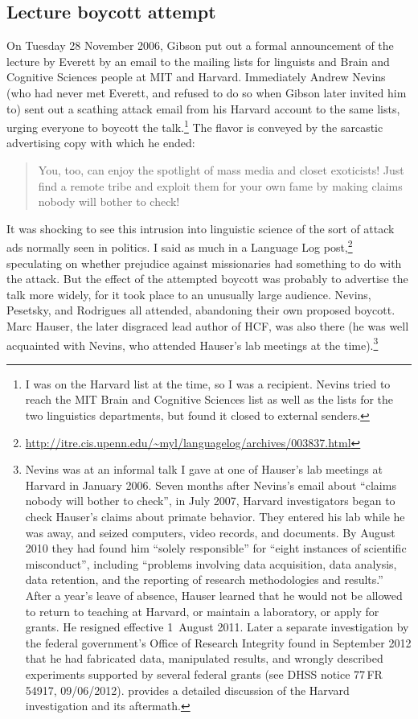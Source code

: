 \documentclass[output=paper,colorlinks,citecolor=brown
]{langscibook}
\begin{document}
\subsection{Lecture boycott attempt}

On Tuesday 28 November 2006, Gibson put out a formal announcement of
the lecture by Everett by an email to the mailing lists for linguists
and Brain and Cognitive Sciences people at MIT and Harvard. Immediately Andrew Nevins (who had
never met Everett, and refused to do so when Gibson later invited him to)
sent out a scathing attack email from his Harvard account to the same
lists, urging everyone to boycott the talk.\footnote{%
   I was on the Harvard list at the time, so I was a recipient. Nevins
   tried to reach the MIT Brain and Cognitive Sciences list as well as
   the lists for the two linguistics departments, but found it closed to
   external senders.}
The flavor is conveyed by the sarcastic advertising copy with which
he ended:
\begin{quote}
You, too, can enjoy the spotlight of mass media and closet
exoticists! Just find a remote tribe and exploit them for your
own fame by making claims nobody will bother to check!
\end{quote}

It was shocking to see this intrusion into linguistic science of the
sort of attack ads normally seen in politics. I said as much in a
Language Log post,\footnote{%
   \url{http://itre.cis.upenn.edu/~myl/languagelog/archives/003837.html}}
speculating on whether prejudice against missionaries had something to
do with the attack. But the effect of the attempted boycott was probably
to advertise the talk more widely, for it took place to an unusually
large audience. Nevins, Pesetsky, and Rodrigues all attended, abandoning
their own proposed boycott.  Marc Hauser, the later disgraced lead author
of HCF, was also there (he was well acquainted with Nevins, who attended
Hauser's lab meetings at the time).\footnote{\label{misconduct}Nevins was at an informal talk I gave at one of Hauser's lab meetings
   at Harvard in January 2006. Seven months after Nevins's email about
   ``claims nobody will bother to check'', in July 2007, Harvard
   investigators began to check Hauser's claims about primate behavior.
   They entered his lab while he was away, and seized computers, video
   records, and documents. By August 2010 they had found him ``solely
   responsible'' for ``eight instances of scientific misconduct'', including
   ``problems involving data acquisition, data analysis, data retention,
   and the reporting of research methodologies and results.'' After a year's
   leave of absence, Hauser learned that he would not be allowed to return
   to teaching at Harvard, or maintain a laboratory, or apply for grants.
   He resigned effective 1~August 2011. Later a separate investigation by
   the federal government's Office of Research Integrity found in September
   2012 that he had fabricated data, manipulated results, and wrongly
   described experiments supported by several federal grants (see DHSS
   notice 77\,FR\,54917, 09/06/2012). \citet{Gross11} provides a detailed
   discussion of the Harvard investigation and its aftermath.}
\end{document}
